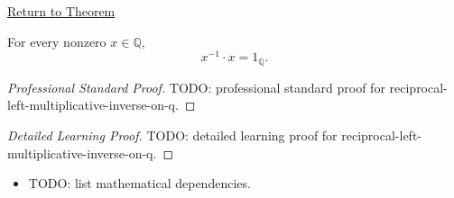 \newpage
{}
\label{prf:reciprocal-left-multiplicative-inverse-on-q}

\begin{remark*}[Return]
\hyperref[thm:reciprocal-left-multiplicative-inverse-on-q]{Return to Theorem}
\end{remark*}

\begin{theorem*}
For every nonzero $x\in\mathbb{Q}$,
\[
x^{-1}\cdot x=1_{\mathbb{Q}}.
\]
\end{theorem*}

\begin{proof}[Professional Standard Proof]
\LRAProofBodyStart
TODO: professional standard proof for reciprocal-left-multiplicative-inverse-on-q.
\end{proof}

\begin{proof}[Detailed Learning Proof]
\LRAProofBodyStart
TODO: detailed learning proof for reciprocal-left-multiplicative-inverse-on-q.
\end{proof}

\begin{remark*}
\end{remark*}

\begin{dependencies}
\begin{itemize}
  \item TODO: list mathematical dependencies.
\end{itemize}
\end{dependencies}

\clearpage
